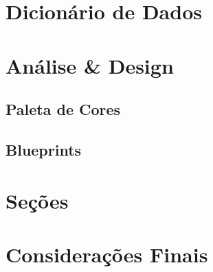 \documentclass[a4paper,12pt]{article}
\begin{document}
\section{Dicionário de Dados}
\pagebreak
\section{Análise \& Design}
\subsection{Paleta de Cores}
\subsection{Blueprints}
\pagebreak
\section{Seções}
\pagebreak
\section{Considerações Finais}
\end{document}
